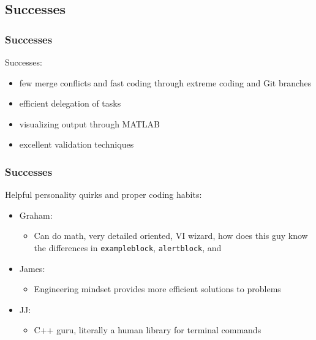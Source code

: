 \documentclass[usernames,dvipsnames]{beamer}
\begin{document}
\subsection{Successes}

\begin{frame}	
	\frametitle{Successes}
	
	\begin{exampleblock}{Successes:}
		\begin{itemize}
		\item few merge conflicts and fast coding through extreme coding and Git branches
		\item efficient delegation of tasks
		\item visualizing output through MATLAB
		\item excellent validation techniques
		\end{itemize}
	\end{exampleblock}

\end{frame}

\begin{frame}	
	\frametitle{Successes}
	
	\begin{exampleblock}{Helpful personality quirks and proper coding habits:}
		\begin{itemize}
			\setlength\itemsep{0.5pt}
			\item Graham: \\
				\begin{itemize}
					\setlength\itemsep{0.5pt}
					\item Can do math, very detailed oriented, VI wizard, how does this guy know the differences in \texttt{exampleblock}, \texttt{alertblock}, and 
				\end{itemize}
			\item James: \\
				\begin{itemize}
					\setlength\itemsep{0.5pt}
					\item Engineering mindset provides more efficient solutions to problems
				\end{itemize}
			\item JJ: \\
				\begin{itemize}
					\setlength\itemsep{0.5pt}
					\item C++ guru, literally a human library for terminal commands
				\end{itemize}
		\end{itemize}
	\end{exampleblock}

\end{frame}
\end{document}
